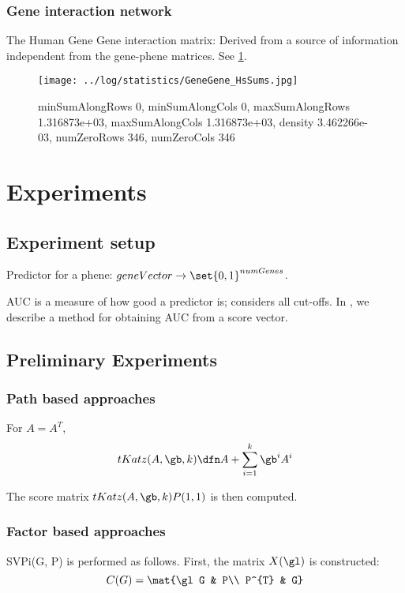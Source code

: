 \documentclass{report}
\begin{document}
\subsection{Gene interaction network}
The Human Gene Gene interaction matrix: Derived from a source of information independent from the gene-phene matrices. See \ref{fig:G(1,1)}.

\begin{figure}
\texttt{[image: ../log/statistics/GeneGene\_HsSums.jpg]}

\caption{
minSumAlongRows 0, minSumAlongCols 0, maxSumAlongRows 1.316873e+03, maxSumAlongCols 1.316873e+03, density 3.462266e-03, numZeroRows 346, numZeroCols 346}
\label{fig:G(1,1)}
\end{figure}



\chapter{Experiments}
\section{Experiment setup}
Predictor for a phene: $geneVector \to \set{0, 1}^{numGenes}$.

AUC is a measure of how good a predictor is; considers all cut-offs. In \cite{AUCRef}, we describe a method for obtaining AUC from a score vector.



\section{Preliminary Experiments}
\subsection{Path based approaches}
For $A = A^{T}$, 
$$tKatz(A, \gb, k) \dfn A + \sum_{i = 1}^{k} \gb^{i} A^{i}$$

The score matrix $tKatz(A, \gb, k)P(1,1)$ is then computed.

\subsection{Factor based approaches}
SVPi(G, P) is performed as follows. First, the matrix $X(\gl)$ is constructed:
$$C(G) = \mat{\gl G & P\\
P^{T} & G}$$
\end{document}
